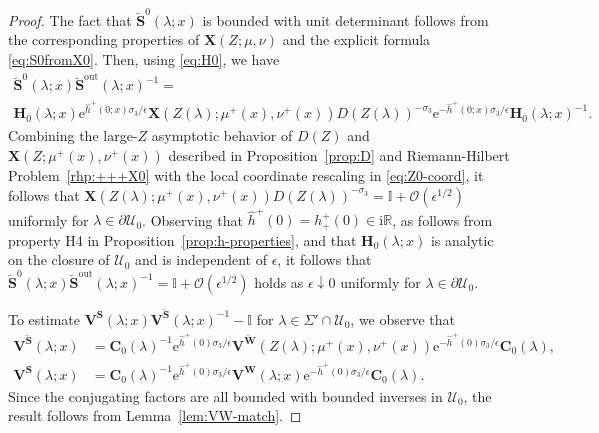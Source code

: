 \documentclass[12pt]{amsart}
\numberwithin{equation}{section}
\newcommand{\ee}{\mathrm{e}}
\newcommand{\ii}{\mathrm{i}}
\newcommand{\SP}{\lambda}
\newcommand{\R}{\mathbb{R}}
\newcommand{\eps}{\epsilon}
\newcommand{\bigo}[1]{ \mathcal{O}\! \left( #1 \right) }
\begin{document}
\begin{proof}
The fact that $\breve{\mathbf{S}}^0(\SP;x)$ is bounded with unit determinant follows from the corresponding properties of $\mathbf{X}(Z;\mu,\nu)$ and the explicit formula \eqref{eq:S0fromX0}. Then, using \eqref{eq:H0}, we have
\begin{multline}
	\breve{\mathbf{S}}^0(\SP;x) \breve{\mathbf{S}}^{\mathrm{out}}(\SP;x)^{-1} =  \\
	\mathbf{H}_0(\SP ; x) \ee^{\hat{h}^+(0;x) \sigma_3/\eps} \mathbf{X}( Z(\SP) ; \mu^+(x), \nu^+(x)) D(Z(\SP))^{-\sigma_3} \ee^{-\hat{h}^+(0;x) \sigma_3/\eps} \mathbf{H}_0(\SP ; x)^{-1}.
\end{multline}
Combining the large-$Z$ asymptotic behavior of $D(Z)$ and $\mathbf{X}(Z; \mu^+(x), \nu^+(x))$ described in Proposition~\ref{prop:D} and Riemann-Hilbert Problem~\ref{rhp:+++X0} with the local coordinate rescaling in \eqref{eq:Z0-coord}, it follows that $\mathbf{X}( Z(\SP) ; \mu^+(x), \nu^+(x)) D(Z(\SP))^{-\sigma_3} = \mathbb{I} + \bigo{\eps^{1/2}}$ uniformly for $\SP \in \partial \mathcal{U}_0$. Observing that $\hat{h}^+(0) = h_+^+(0) \in \ii \R$, as follows from property H4 in Proposition~\ref{prop:h-properties}, and that $\mathbf{H}_0(\SP;x)$ is analytic on the closure of $\mathcal{U}_0$ and is independent of $\eps$, it follows that $\breve{\mathbf{S}}^0(\SP;x) \breve{\mathbf{S}}^{\mathrm{out}}(\SP;x)^{-1} = \mathbb{I} + \bigo{\eps^{1/2}}$ holds as $\eps \downarrow 0$ uniformly for $\SP \in \partial \mathcal{U}_0$. 

To estimate $\mathbf{V}^\mathbf{S}(\SP;x) \mathbf{V}^{\breve{\mathbf{S}}}(\SP;x)^{-1} - \mathbb{I}$ for $\SP \in \Sigma' \cap \mathcal{U}_0$, we observe that 
\begin{equation}
	\begin{aligned}
	\mathbf{V}^{\breve{\mathbf{S}}}(\SP;x) &= \mathbf{C}_0(\SP)^{-1} \ee^{\hat{h}^+(0) \sigma_3/\eps} \mathbf{V}^{\breve{\mathbf{W}}}(Z(\SP); \mu^+(x), \nu^+(x)) \ee^{-\hat{h}^+(0) \sigma_3/\eps}\mathbf{C}_0(\SP), \\
	\mathbf{V^S}(\SP;x) &= \mathbf{C}_0(\SP)^{-1} \ee^{\hat{h}^+(0) \sigma_3/\eps} \mathbf{V^W}(\SP;x) \ee^{-\hat{h}^+(0) \sigma_3/\eps}\mathbf{C}_0(\SP). 
\end{aligned}
\end{equation}
Since the conjugating factors are all bounded with bounded inverses in $\mathcal{U}_0$, the result follows from Lemma~\ref{lem:VW-match}.
\end{proof}
\end{document}

